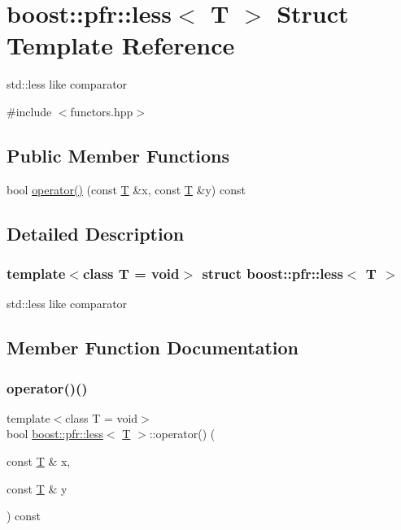 \hypertarget{structboost_1_1pfr_1_1less}{}\section{boost\+:\+:pfr\+:\+:less$<$ T $>$ Struct Template Reference}
\label{structboost_1_1pfr_1_1less}


std\+::less like comparator  




{\ttfamily \#include $<$functors.\+hpp$>$}

\subsection*{Public Member Functions}
\begin{DoxyCompactItemize}
\item 
bool \mbox{\hyperlink{structboost_1_1pfr_1_1less_ae9d40278896ffcfa58a71e134fbe1eb7}{operator()}} (const \mbox{\hyperlink{struct_t}{T}} \&x, const \mbox{\hyperlink{struct_t}{T}} \&y) const
\end{DoxyCompactItemize}


\subsection{Detailed Description}
\subsubsection*{template$<$class T = void$>$\newline
struct boost\+::pfr\+::less$<$ T $>$}

std\+::less like comparator 

\subsection{Member Function Documentation}
\mbox{\label{structboost_1_1pfr_1_1less_ae9d40278896ffcfa58a71e134fbe1eb7}} 
\subsubsection{\texorpdfstring{operator()()}{operator()()}}
{\footnotesize\ttfamily template$<$class T  = void$>$ \\
bool \mbox{\hyperlink{structboost_1_1pfr_1_1less}{boost\+::pfr\+::less}}$<$ \mbox{\hyperlink{struct_t}{T}} $>$\+::operator() (\begin{DoxyParamCaption}\item[{const \mbox{\hyperlink{struct_t}{T}} \&}]{x,  }\item[{const \mbox{\hyperlink{struct_t}{T}} \&}]{y }\end{DoxyParamCaption}) const\hspace{0.3cm}{\ttfamily [inline]}}

